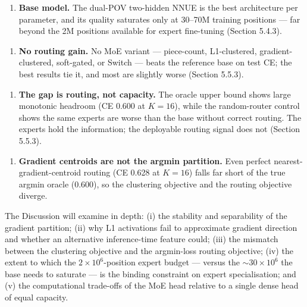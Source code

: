 \begin{enumerate}
  \item \textbf{Base model.} The dual-POV two-hidden NNUE is the best architecture per parameter, and its quality saturates only at 30--70M training positions --- far beyond the 2M positions available for expert fine-tuning (Section 5.4.3).
\end{enumerate}


\begin{enumerate}
  \item \textbf{No routing gain.} No MoE variant --- piece-count, L1-clustered, gradient-clustered, soft-gated, or Switch --- beats the reference base on test CE; the best results tie it, and most are slightly worse (Section 5.5.3).
\end{enumerate}


\begin{enumerate}
  \item \textbf{The gap is routing, not capacity.} The oracle upper bound shows large monotonic headroom (CE 0.600 at $K{=}16$), while the random-router control shows the same experts are worse than the base without correct routing. The experts hold the information; the deployable routing signal does not (Section 5.5.3).
\end{enumerate}


\begin{enumerate}
  \item \textbf{Gradient centroids are not the argmin partition.} Even perfect nearest-gradient-centroid routing (CE 0.628 at $K{=}16$) falls far short of the true argmin oracle (0.600), so the clustering objective and the routing objective diverge.
\end{enumerate}


The Discussion will examine in depth: (i) the stability and separability of the gradient partition; (ii) why L1 activations fail to approximate gradient direction and whether an alternative inference-time feature could; (iii) the mismatch between the clustering objective and the argmin-loss routing objective; (iv) the extent to which the $2\times10^6$-position expert budget --- versus the $\sim 30\times10^6$ the base needs to saturate --- is the binding constraint on expert specialisation; and (v) the computational trade-offs of the MoE head relative to a single dense head of equal capacity.